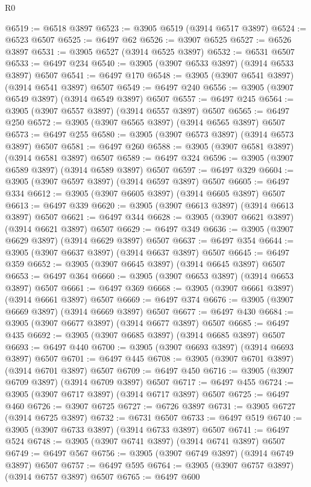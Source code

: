 \begin{lexlean}{R0}
\begin{coremodule}
@6519 := @6518 @3897
@6523 := @3905 @6519 (@3914 @6517 @3897)
@6524 := @6523 @6507
@6525 := @6497 @62
@6526 := @3907 @6525
@6527 := @6526 @3897
@6531 := @3905 @6527 (@3914 @6525 @3897)
@6532 := @6531 @6507
@6533 := @6497 @234
@6540 := @3905 (@3907 @6533 @3897) (@3914 @6533 @3897) @6507
@6541 := @6497 @170
@6548 := @3905 (@3907 @6541 @3897) (@3914 @6541 @3897) @6507
@6549 := @6497 @240
@6556 := @3905 (@3907 @6549 @3897) (@3914 @6549 @3897) @6507
@6557 := @6497 @245
@6564 := @3905 (@3907 @6557 @3897) (@3914 @6557 @3897) @6507
@6565 := @6497 @250
@6572 := @3905 (@3907 @6565 @3897) (@3914 @6565 @3897) @6507
@6573 := @6497 @255
@6580 := @3905 (@3907 @6573 @3897) (@3914 @6573 @3897) @6507
@6581 := @6497 @260
@6588 := @3905 (@3907 @6581 @3897) (@3914 @6581 @3897) @6507
@6589 := @6497 @324
@6596 := @3905 (@3907 @6589 @3897) (@3914 @6589 @3897) @6507
@6597 := @6497 @329
@6604 := @3905 (@3907 @6597 @3897) (@3914 @6597 @3897) @6507
@6605 := @6497 @334
@6612 := @3905 (@3907 @6605 @3897) (@3914 @6605 @3897) @6507
@6613 := @6497 @339
@6620 := @3905 (@3907 @6613 @3897) (@3914 @6613 @3897) @6507
@6621 := @6497 @344
@6628 := @3905 (@3907 @6621 @3897) (@3914 @6621 @3897) @6507
@6629 := @6497 @349
@6636 := @3905 (@3907 @6629 @3897) (@3914 @6629 @3897) @6507
@6637 := @6497 @354
@6644 := @3905 (@3907 @6637 @3897) (@3914 @6637 @3897) @6507
@6645 := @6497 @359
@6652 := @3905 (@3907 @6645 @3897) (@3914 @6645 @3897) @6507
@6653 := @6497 @364
@6660 := @3905 (@3907 @6653 @3897) (@3914 @6653 @3897) @6507
@6661 := @6497 @369
@6668 := @3905 (@3907 @6661 @3897) (@3914 @6661 @3897) @6507
@6669 := @6497 @374
@6676 := @3905 (@3907 @6669 @3897) (@3914 @6669 @3897) @6507
@6677 := @6497 @430
@6684 := @3905 (@3907 @6677 @3897) (@3914 @6677 @3897) @6507
@6685 := @6497 @435
@6692 := @3905 (@3907 @6685 @3897) (@3914 @6685 @3897) @6507
@6693 := @6497 @440
@6700 := @3905 (@3907 @6693 @3897) (@3914 @6693 @3897) @6507
@6701 := @6497 @445
@6708 := @3905 (@3907 @6701 @3897) (@3914 @6701 @3897) @6507
@6709 := @6497 @450
@6716 := @3905 (@3907 @6709 @3897) (@3914 @6709 @3897) @6507
@6717 := @6497 @455
@6724 := @3905 (@3907 @6717 @3897) (@3914 @6717 @3897) @6507
@6725 := @6497 @460
@6726 := @3907 @6725
@6727 := @6726 @3897
@6731 := @3905 @6727 (@3914 @6725 @3897)
@6732 := @6731 @6507
@6733 := @6497 @519
@6740 := @3905 (@3907 @6733 @3897) (@3914 @6733 @3897) @6507
@6741 := @6497 @524
@6748 := @3905 (@3907 @6741 @3897) (@3914 @6741 @3897) @6507
@6749 := @6497 @567
@6756 := @3905 (@3907 @6749 @3897) (@3914 @6749 @3897) @6507
@6757 := @6497 @595
@6764 := @3905 (@3907 @6757 @3897) (@3914 @6757 @3897) @6507
@6765 := @6497 @600

\end{coremodule}
\end{lexlean}
